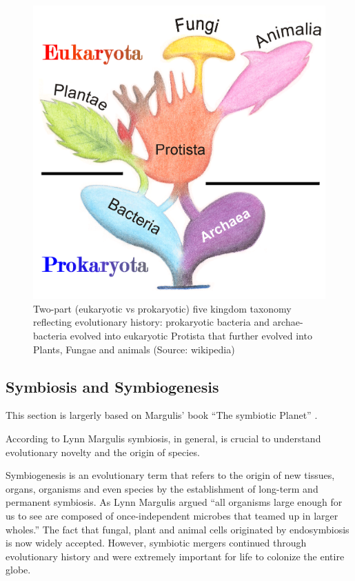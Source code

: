 \documentclass[
  11pt,
]{book}
\begin{document}
\begin{figure}

{\centering \includegraphics[width=0.8\linewidth]{./figs/fiveKingdoms} 

}

\caption{Two-part (eukaryotic vs prokaryotic) five kingdom taxonomy reflecting evolutionary history: prokaryotic bacteria and archae-bacteria evolved into eukaryotic Protista that further evolved into Plants, Fungae and animals (Source: wikipedia)}\label{fig:fiveKingdoms}
\end{figure}

\hypertarget{symbiosis-and-symbiogenesis}{%
\subsection{Symbiosis and Symbiogenesis}\label{symbiosis-and-symbiogenesis}}

This section is largerly based on Margulis' book ``The symbiotic Planet'' \citep{margulis1999}.

According to Lynn Margulis symbiosis, in general, is crucial to understand evolutionary novelty and the origin of species.

Symbiogenesis is an evolutionary term that refers to the origin of new tissues, organs, organisms and even species by the establishment of long-term and permanent symbiosis.
As Lynn Margulis argued ``all organisms large enough for us to see are composed of once-independent microbes that teamed up in larger wholes.''
The fact that fungal, plant and animal cells originated by endosymbiosis is now widely accepted. However, symbiotic mergers continued through evolutionary history and were extremely important for life to colonize the entire globe.
\end{document}
